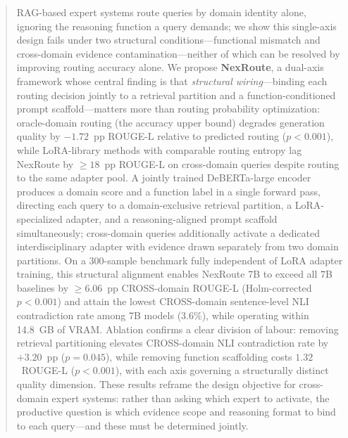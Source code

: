 


\begin{abstract}
RAG-based expert systems route queries by domain identity alone, ignoring the
reasoning function a query demands; we show this single-axis design fails under
two structural conditions---functional mismatch and cross-domain evidence
contamination---neither of which can be resolved by improving routing accuracy alone.
We propose \textbf{NexRoute}, a dual-axis framework whose central finding is that
\emph{structural wiring}---binding each routing decision jointly to a retrieval
partition and a function-conditioned prompt scaffold---matters more than routing
probability optimization: oracle-domain routing (the accuracy upper bound) degrades
generation quality by $-1.72$~pp ROUGE-L relative to predicted routing ($p{<}0.001$),
while LoRA-library methods with comparable routing entropy lag NexRoute by
${\geq}18$~pp ROUGE-L on cross-domain queries despite routing to the same adapter pool.
A jointly trained DeBERTa-large encoder produces a domain score and a function label
in a single forward pass, directing each query to a domain-exclusive retrieval
partition, a LoRA-specialized adapter, and a reasoning-aligned prompt scaffold
simultaneously; cross-domain queries additionally activate a dedicated interdisciplinary
adapter with evidence drawn separately from two domain partitions.
On a 300-sample benchmark fully independent of LoRA adapter training, this structural
alignment enables NexRoute 7B to exceed all 7B baselines by ${\geq}6.06$~pp
CROSS-domain ROUGE-L (Holm-corrected $p{<}0.001$) and attain the lowest CROSS-domain
sentence-level NLI contradiction rate among 7B models ($3.6\%$), while
operating within 14.8~GB of VRAM.
Ablation confirms a clear division of labour: removing retrieval partitioning
elevates CROSS-domain NLI contradiction rate by $+3.20$~pp ($p{=}0.045$), while
removing function scaffolding costs $1.32$~ROUGE-L ($p{<}0.001$), with each axis
governing a structurally distinct quality dimension.
These results reframe the design objective for cross-domain expert systems: rather
than asking which expert to activate, the productive question is which evidence
scope and reasoning format to bind to each query---and these must be determined jointly.
\end{abstract}

